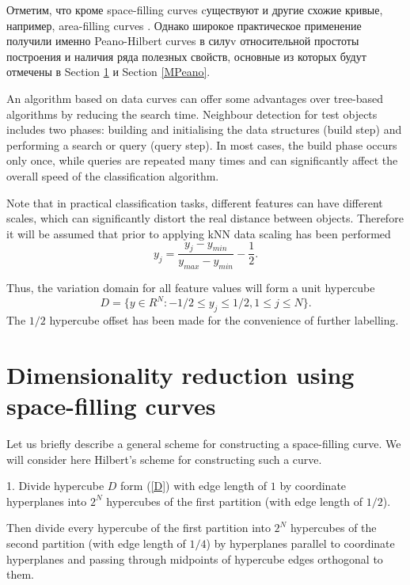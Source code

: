 \documentclass[entropy,article,submit,moreauthors,pdftex]{Definitions/mdpi}
\begin{document}
Отметим, что кроме space-filling curves cуществуют и другие схожие кривые, например, area-filling curves \cite{Nasso2022}. Однако широкое практическое применение получили именно Peano-Hilbert curves в силуv относительной простоты построения и наличия ряда полезных свойств, основные из которых будут отмечены в Section \ref{Peano} и Section \ref{MPeano}.


An algorithm based on data curves can offer some advantages over tree-based algorithms by reducing the search time. Neighbour detection for test objects includes two phases: building and initialising the data structures (build step) and performing a search or query (query step). In most cases, the build phase occurs only once, while queries are repeated many times and can significantly affect the overall speed of the classification algorithm. 

Note that in practical classification tasks, different features can have different scales, which can significantly distort the real distance between objects. Therefore it will be assumed that prior to applying kNN data scaling has been performed 
\begin{equation}
y_j = \frac{y_j - y_{min}} {y_{max} - y_{min}} - \frac{1} {2}.
\end{equation} 

Thus, the variation domain for all feature values will form a unit hypercube
\begin{equation}\label{D}
D = \{ y \in R^N: -1/2 \leq y_j \leq 1/2,  1 \leq j \leq N \}.
\end{equation} 
The $1/2$ hypercube offset  has been made for the convenience of further labelling.

\section{Dimensionality reduction using space-filling curves}\label{Peano}

Let us briefly describe a general scheme for constructing a space-filling curve. We will consider here Hilbert's scheme for constructing such a curve.

1. Divide hypercube $D$ form (\ref{D}) with edge length of $1$ by coordinate hyperplanes into $2^N$ hypercubes of the first partition (with edge length of $1/2$).

Then divide every hypercube of the first partition into $2^N$  hypercubes of the second partition (with edge length of $1/4$) by hyperplanes parallel to coordinate hyperplanes and passing through midpoints of hypercube edges orthogonal to them.
\end{document}
